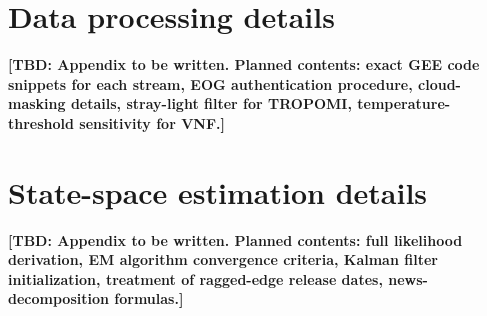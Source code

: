 \documentclass[11pt,letterpaper]{article}
\newcommand{\tbdline}[1]{\textcolor{yellow!60!black}{\textbf{[TBD: #1]}}}
\begin{document}


\section{Data processing details}
\label{app:data}

\tbdline{Appendix to be written. Planned contents: exact GEE code snippets for each stream, EOG authentication procedure, cloud-masking details, stray-light filter for TROPOMI, temperature-threshold sensitivity for VNF.}

\section{State-space estimation details}
\label{app:state_space}

\tbdline{Appendix to be written. Planned contents: full likelihood derivation, EM algorithm convergence criteria, Kalman filter initialization, treatment of ragged-edge release dates, news-decomposition formulas.}

\newpage

\end{document}
